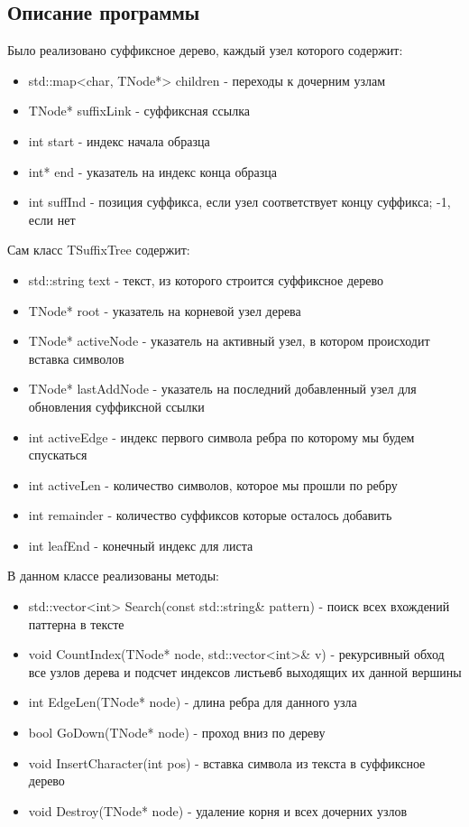 \documentclass[12pt]{article}
\begin{document}
\subsection*{Описание программы}

Было реализовано суффиксное дерево, каждый узел которого содержит:
\begin{itemize}
    \item std::map<char, TNode*> children - переходы к дочерним узлам
    \item TNode* suffixLink - суффиксная ссылка
    \item int start - индекс начала образца
    \item int* end - указатель на индекс конца образца
    \item int suffInd - позиция суффикса, если узел соответствует концу суффикса; -1, если нет
\end{itemize}

\newline
Сам класс TSuffixTree содержит:
\begin{itemize}
    \item std::string text - текст, из которого строится суффиксное дерево
    \item TNode* root - указатель на корневой узел дерева
    \item TNode* activeNode - указатель на активный узел, в котором происходит вставка символов
    \item TNode* lastAddNode - указатель на последний добавленный узел для обновления суффиксной ссылки
    \item int activeEdge - индекс первого символа ребра по которому мы будем спускаться
    \item int activeLen - количество символов, которое мы прошли по ребру
    \item int remainder - количество суффиксов которые осталось добавить
    \item int leafEnd - конечный индекс для листа
\end{itemize}

\newline
В данном классе реализованы методы:
\begin{itemize}
    \item std::vector<int> Search(const std::string& pattern) - поиск всех вхождений паттерна в тексте
    \item void CountIndex(TNode* node, std::vector<int>& v) -  рекурсивный обход все узлов дерева и подсчет индексов листьевб выходящих их данной вершины
    \item int EdgeLen(TNode* node) - длина ребра для данного узла
    \item bool GoDown(TNode* node) - проход вниз по дереву
    \item void InsertCharacter(int pos) - вставка символа из текста в суффиксное дерево
    \item void Destroy(TNode* node) - удаление корня и всех дочерних узлов
\end{itemize}
\end{document}
